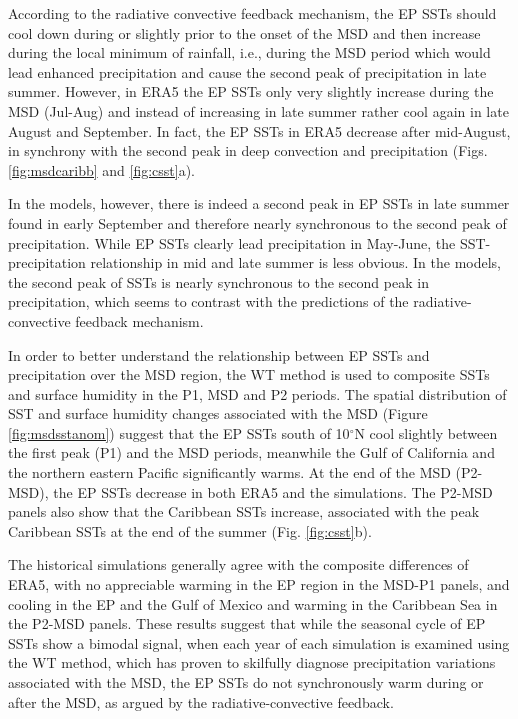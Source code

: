 According to the radiative convective feedback mechanism, the EP SSTs should cool down during or slightly prior to the onset of the MSD and then increase during the local minimum of rainfall, i.e., during the MSD period which would lead enhanced precipitation and cause the second peak of precipitation in late summer. However, in ERA5 the EP SSTs only very slightly increase during the MSD (Jul-Aug) and instead of increasing in late summer rather cool again in late August and September. In fact, the EP SSTs in ERA5 decrease after mid-August, in synchrony with the second peak in deep convection and precipitation (Figs. \ref{fig:msdcaribb} and \ref{fig:csst}a).

 In the models, however, there is indeed a second peak in EP SSTs in late summer found in early September and therefore nearly synchronous to the second peak of precipitation. While EP SSTs clearly lead precipitation in May-June, the SST-precipitation relationship in mid and late summer is less obvious. In the models, the second peak of SSTs is nearly synchronous to the second peak in precipitation, which seems to contrast with the predictions of the radiative-convective feedback mechanism.
 
In order to better understand the relationship between EP SSTs and precipitation over the MSD region, the WT method is used to composite SSTs and surface humidity in the P1, MSD and P2 periods. 
The spatial distribution of SST and surface humidity changes associated with the MSD  (Figure \ref{fig:msdsstanom}) suggest that the EP SSTs south of 10$^\circ$N cool slightly between the first peak (P1) and the MSD periods, meanwhile the Gulf of California and the northern eastern Pacific significantly warms. At the end of the MSD (P2-MSD), the EP SSTs decrease in both ERA5 and the simulations. 
The P2-MSD panels also show that the Caribbean SSTs increase, associated with the peak Caribbean SSTs  at the end of the summer (Fig. \ref{fig:csst}b).

The historical simulations generally agree with the composite differences of ERA5, with no appreciable warming in the EP region in the MSD-P1 panels, and cooling in the EP and the Gulf of Mexico and warming in the Caribbean Sea in the P2-MSD panels.
These results suggest that while the seasonal cycle of EP SSTs show a bimodal signal, when each year of each simulation is examined using the WT method, which has proven to skilfully diagnose precipitation variations associated with the MSD, the EP SSTs do not synchronously warm during or after the MSD, as argued by the radiative-convective feedback.


